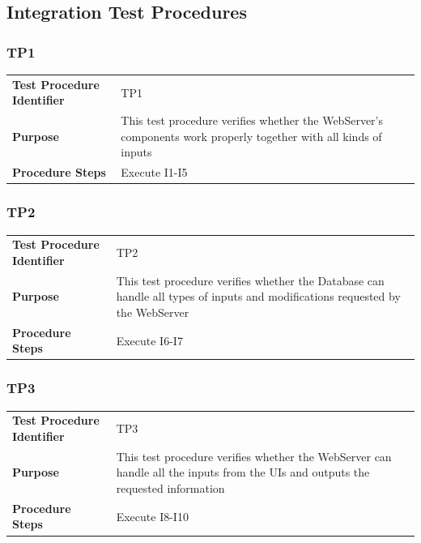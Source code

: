 \documentclass{article}
\begin{document}
\subsection{Integration Test Procedures}
\subsubsection{TP1}
\begin{adjustbox}{width=1.2\textwidth}	
	\begin{tabular}{*{2}{p{}}}
		\midrule
		\textbf{Test Procedure Identifier} & TP1\\
		\textbf{Purpose} & This test procedure verifies whether the WebServer's components work properly together with all kinds of inputs\\ 
		\textbf{Procedure Steps} & Execute I1-I5\\
		\bottomrule
	\end{tabular}
\end{adjustbox}
\subsubsection{TP2}
\begin{adjustbox}{width=1.2\textwidth}	
	\begin{tabular}{*{2}{p{}}}
		\midrule
		\textbf{Test Procedure Identifier} & TP2\\
		\textbf{Purpose} & This test procedure verifies whether the Database can handle all types of inputs and modifications requested by the WebServer\\ 
		\textbf{Procedure Steps} & Execute I6-I7\\
		\bottomrule
	\end{tabular}
\end{adjustbox}
\subsubsection{TP3}
\begin{adjustbox}{width=1.2\textwidth}	
	\begin{tabular}{*{2}{p{}}}
		\midrule
		\textbf{Test Procedure Identifier} & TP3\\
		\textbf{Purpose} & This test procedure verifies whether the WebServer can handle all the inputs from the UIs and outputs the requested information\\ 
		\textbf{Procedure Steps} & Execute I8-I10\\
		\bottomrule
	\end{tabular}
\end{adjustbox}
\end{document}

